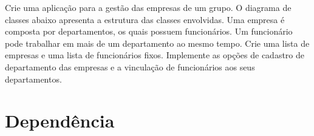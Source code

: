 \begin{exercise}[GestaoEmpresas]
Crie uma aplicação para a gestão das empresas de um grupo. O diagrama de classes abaixo apresenta a estrutura das classes envolvidas. Uma empresa é composta por departamentos, os quais possuem funcionários. Um funcionário pode trabalhar em mais de um departamento ao mesmo tempo. Crie uma lista de empresas e uma lista de funcionários fixos. Implemente as opções de cadastro de departamento das empresas e a vinculação de funcionários aos seus departamentos.

\begin{figure}[h]
	\centering
\end{figure}
\end{exercise}

\clearpage

\section{Dependência}


